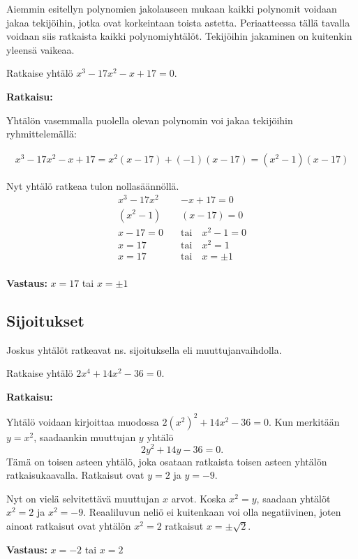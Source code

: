 Aiemmin esitellyn polynomien jakolauseen mukaan kaikki polynomit voidaan jakaa tekijöihin, jotka ovat korkeintaan toista astetta.
Periaatteessa tällä tavalla voidaan siis ratkaista kaikki polynomiyhtälöt. Tekijöihin jakaminen on kuitenkin yleensä vaikeaa.


\begin{esimerkki}
Ratkaise yhtälö $x^3-17x^2-x+17 = 0$.

\textbf{Ratkaisu:}

Yhtälön vasemmalla puolella olevan polynomin voi jakaa tekijöihin ryhmittelemällä:

\begin{align*}
x^3-17x^2-x+17=x^2(x-17)+(-1)(x-17)=(x^2-1)(x-17)
\end{align*}

Nyt yhtälö ratkeaa tulon nollasäännöllä.
\begin{align*}
x^3-17x^2&-x+17=0 \\
(x^2-1)&(x-17)=0 \\
x - 17 = 0 \quad &\text{tai} \quad x^2-1 = 0 \\
x = 17 \quad &\text{tai} \quad x^2 = 1 \\
x = 17 \quad &\text{tai} \quad x =\pm 1 \\
\end{align*}

\textbf{Vastaus:} $x = 17$ tai $x = \pm 1$
\end{esimerkki}

\subsection*{Sijoitukset}
Joskus yhtälöt ratkeavat ns. sijoituksella eli muuttujanvaihdolla.


\begin{esimerkki}
Ratkaise yhtälö $2x^4+14x^2-36=0$.

\textbf{Ratkaisu:}

Yhtälö voidaan kirjoittaa muodossa $2(x^2)^2+14x^2-36=0$. Kun merkitään $y=x^2$, saadaankin muuttujan $y$ yhtälö
\[2y^2+14y-36=0.\]
Tämä on toisen asteen yhtälö, joka osataan ratkaista toisen asteen yhtälön ratkaisukaavalla. Ratkaisut ovat $y = 2$ ja $y = -9$.

Nyt on vielä selvitettävä muuttujan $x$ arvot. Koska $x^2=y$, saadaan yhtälöt $x^2=2$ ja $x^2=-9$. Reaaliluvun neliö ei kuitenkaan voi olla negatiivinen, joten ainoat ratkaisut ovat yhtälön $x^2 = 2$ ratkaisut $x = \pm\sqrt{2}$.

\textbf{Vastaus:} $x=-2$ tai $x=2$
\end{esimerkki}

